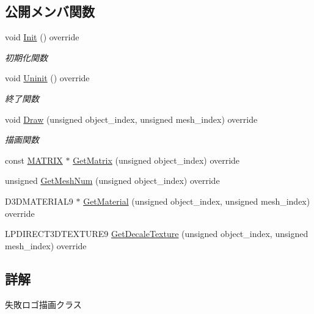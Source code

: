\subsection*{公開メンバ関数}
\begin{DoxyCompactItemize}
\item 
void \mbox{\hyperlink{class_failure_logo_draw_a718d587edcabb1feea72153a79a65176}{Init}} () override
\begin{DoxyCompactList}\small\item\em 初期化関数 \end{DoxyCompactList}\item 
void \mbox{\hyperlink{class_failure_logo_draw_a97646253380b54f37565650e211f33cd}{Uninit}} () override
\begin{DoxyCompactList}\small\item\em 終了関数 \end{DoxyCompactList}\item 
void \mbox{\hyperlink{class_failure_logo_draw_a8ee20e1697bbbaf7f41c18334830488a}{Draw}} (unsigned object\+\_\+index, unsigned mesh\+\_\+index) override
\begin{DoxyCompactList}\small\item\em 描画関数 \end{DoxyCompactList}\item 
const \mbox{\hyperlink{_vector3_d_8h_a032295cd9fb1b711757c90667278e744}{M\+A\+T\+R\+IX}} $\ast$ \mbox{\hyperlink{class_failure_logo_draw_aefc4be9e6ead4d90a5fc9c22cc07fe92}{Get\+Matrix}} (unsigned object\+\_\+index) override
\item 
unsigned \mbox{\hyperlink{class_failure_logo_draw_aa7164b6f5788416788482893aa747d59}{Get\+Mesh\+Num}} (unsigned object\+\_\+index) override
\item 
D3\+D\+M\+A\+T\+E\+R\+I\+A\+L9 $\ast$ \mbox{\hyperlink{class_failure_logo_draw_aaac019fb396a354ef0f823ed2bd72322}{Get\+Material}} (unsigned object\+\_\+index, unsigned mesh\+\_\+index) override
\item 
L\+P\+D\+I\+R\+E\+C\+T3\+D\+T\+E\+X\+T\+U\+R\+E9 \mbox{\hyperlink{class_failure_logo_draw_a2a74fafba17b2f63b1c61abd67289afd}{Get\+Decale\+Texture}} (unsigned object\+\_\+index, unsigned mesh\+\_\+index) override
\end{DoxyCompactItemize}


\subsection{詳解}
失敗ロゴ描画クラス 

